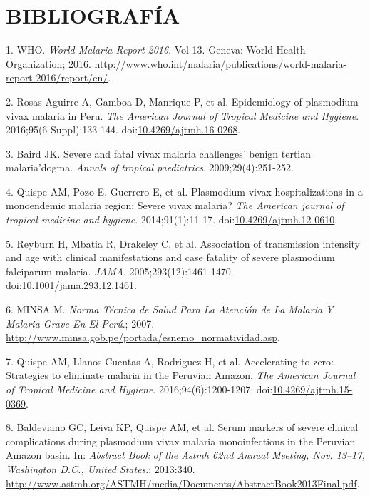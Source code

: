 \documentclass[]{article}
\begin{document}
\section{BIBLIOGRAFÍA}\label{bibliografia}

\hypertarget{refs}{}
\hypertarget{ref-WHO2016world}{}
1. WHO. \emph{World Malaria Report 2016}. Vol 13. Geneva: World Health
Organization; 2016.
\url{http://www.who.int/malaria/publications/world-malaria-report-2016/report/en/}.

\hypertarget{ref-rosas2016peru}{}
2. Rosas-Aguirre A, Gamboa D, Manrique P, et al. Epidemiology of
plasmodium vivax malaria in Peru. \emph{The American Journal of Tropical
Medicine and Hygiene}. 2016;95(6 Suppl):133-144.
doi:\href{https://doi.org/10.4269/ajtmh.16-0268}{10.4269/ajtmh.16-0268}.

\hypertarget{ref-baird2009}{}
3. Baird JK. Severe and fatal vivax malaria challenges' benign tertian
malaria'dogma. \emph{Annals of tropical paediatrics}.
2009;29(4):251-252.

\hypertarget{ref-quispe2014}{}
4. Quispe AM, Pozo E, Guerrero E, et al. Plasmodium vivax
hospitalizations in a monoendemic malaria region: Severe vivax malaria?
\emph{The American journal of tropical medicine and hygiene}.
2014;91(1):11-17.
doi:\href{https://doi.org/10.4269/ajtmh.12-0610}{10.4269/ajtmh.12-0610}.

\hypertarget{ref-reyburn2015}{}
5. Reyburn H, Mbatia R, Drakeley C, et al. Association of transmission
intensity and age with clinical manifestations and case fatality of
severe plasmodium falciparum malaria. \emph{JAMA}.
2005;293(12):1461-1470.
doi:\href{https://doi.org/10.1001/jama.293.12.1461}{10.1001/jama.293.12.1461}.

\hypertarget{ref-norma2001}{}
6. MINSA M. \emph{Norma Técnica de Salud Para La Atención de La Malaria
Y Malaria Grave En El Perú}.; 2007.
\url{http://www.minsa.gob.pe/portada/esnemo_normatividad.asp}.

\hypertarget{ref-accelerate2016}{}
7. Quispe AM, Llanos-Cuentas A, Rodriguez H, et al. Accelerating to
zero: Strategies to eliminate malaria in the Peruvian Amazon. \emph{The
American Journal of Tropical Medicine and Hygiene}.
2016;94(6):1200-1207.
doi:\href{https://doi.org/10.4269/ajtmh.15-0369}{10.4269/ajtmh.15-0369}.

\hypertarget{ref-baldevi2013}{}
8. Baldeviano GC, Leiva KP, Quispe AM, et al. Serum markers of severe
clinical complications during plasmodium vivax malaria monoinfections in
the Peruvian Amazon basin. In: \emph{Abstract Book of the Astmh 62nd
Annual Meeting, Nov. 13--17, Washington D.C., United States}.; 2013:340.
\url{http://www.astmh.org/ASTMH/media/Documents/AbstractBook2013Final.pdf}.
\end{document}
